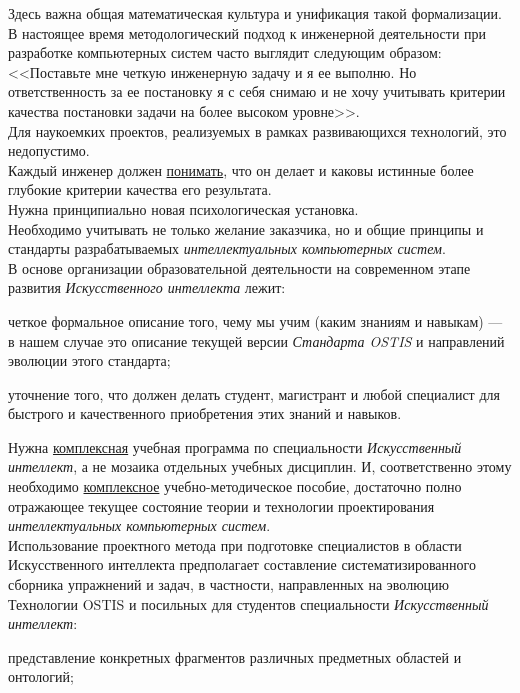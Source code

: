 {    Здесь важна общая математическая культура и унификация такой формализации.\\
    В настоящее время методологический подход к инженерной деятельности при разработке компьютерных систем часто выглядит следующим образом: <<Поставьте мне четкую инженерную задачу и я ее выполню. Но ответственность за ее постановку я с себя снимаю и не хочу учитывать критерии качества постановки задачи на более высоком уровне>>.\\
    Для наукоемких проектов, реализуемых в рамках развивающихся технологий, это недопустимо.\\
    Каждый инженер должен \uline{понимать}, что он делает и каковы истинные более глубокие критерии качества его результата.\\
    Нужна принципиально новая психологическая установка.\\
    Необходимо учитывать не только желание заказчика, но и общие принципы и стандарты разрабатываемых \textit{интеллектуальных компьютерных систем}.\\
    В основе организации образовательной деятельности на современном этапе развития \textit{Искусственного интеллекта} лежит:
    \begin{scnitemize}
        \item четкое формальное описание того, чему мы учим (каким знаниям и навыкам) --- в нашем случае это описание текущей версии \textit{Стандарта OSTIS} и направлений эволюции этого стандарта;
        \item уточнение того, что должен делать студент, магистрант и любой специалист для быстрого и качественного приобретения этих знаний и навыков.
    \end{scnitemize}
    Нужна \uline{комплексная} учебная программа по специальности \textit{Искусственный интеллект}, а не мозаика отдельных учебных дисциплин. И, соответственно этому необходимо \uline{комплексное} учебно-методическое пособие, достаточно полно отражающее текущее состояние теории и технологии проектирования \textit{интеллектуальных компьютерных систем}.\\
    Использование проектного метода при подготовке специалистов в области Искусственного интеллекта предполагает составление систематизированного сборника упражнений и задач, в частности, направленных на эволюцию Технологии OSTIS и посильных для студентов специальности \textit{Искусственный интеллект}:
    \begin{scnitemize}
        \item представление конкретных фрагментов различных предметных областей и онтологий;

\end{scnitemize}}
